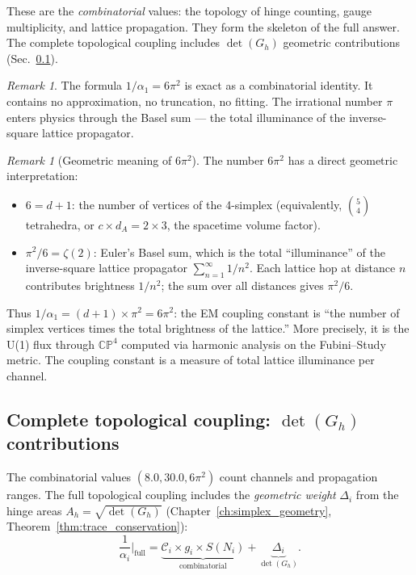 \documentclass[12pt]{article}
\theoremstyle{remark}
\newtheorem{remark}[theorem]{Remark}
\theoremstyle{definition}
\begin{document}
These are the \emph{combinatorial} values: the topology of hinge counting, gauge multiplicity, and lattice propagation. They form the skeleton of the full answer. The complete topological coupling includes $\det(G_h)$ geometric contributions (Sec.~\ref{sec:det_contributions}).

\begin{remark}
The formula $1/\alpha_1 = 6\pi^2$ is exact as a combinatorial identity. It contains no approximation, no truncation, no fitting. The irrational number $\pi$ enters physics through the Basel sum --- the total illuminance of the inverse-square lattice propagator.
\end{remark}

\begin{remark}[Geometric meaning of $6\pi^2$]
The number $6\pi^2$ has a direct geometric interpretation:
\begin{itemize}
\item $6 = d + 1$: the number of vertices of the 4-simplex (equivalently, $\binom{5}{4}$ tetrahedra, or $c \times d_A = 2 \times 3$, the spacetime volume factor).
\item $\pi^2/6 = \zeta(2)$: Euler's Basel sum, which is the total ``illuminance'' of the inverse-square lattice propagator $\sum_{n=1}^\infty 1/n^2$. Each lattice hop at distance $n$ contributes brightness $1/n^2$; the sum over all distances gives $\pi^2/6$.
\end{itemize}
Thus $1/\alpha_1 = (d+1) \times \pi^2 = 6\pi^2$: the EM coupling constant is ``the number of simplex vertices times the total brightness of the lattice.'' More precisely, it is the U(1) flux through $\mathbb{CP}^4$ computed via harmonic analysis on the Fubini--Study metric. The coupling constant is a measure of total lattice illuminance per channel.
\end{remark}

\subsection{Complete topological coupling: $\det(G_h)$ contributions}
\label{sec:det_contributions}

The combinatorial values $(8.0, 30.0, 6\pi^2)$ count channels and propagation ranges. The full topological coupling includes the \emph{geometric weight} $\Delta_i$ from the hinge areas $A_h = \sqrt{\det(G_h)}$ (Chapter~\ref{ch:simplex_geometry}, Theorem~\ref{thm:trace_conservation}):
\begin{equation}
\frac{1}{\alpha_i}\bigg|_\text{full} = \underbrace{\mathcal{C}_i \times g_i \times S(N_i)}_{\text{combinatorial}} + \underbrace{\Delta_i}_{\det(G_h)}.
\end{equation}
\end{document}
